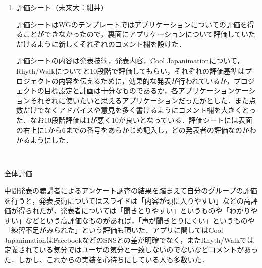 \begin{enumerate}
\item 評価シート（未来大：紺井）
\par
評価シートはWGのテンプレートではアプリケーションについての評価を得ることができなかったので，裏面にアプリケーションについて評価していただけるように新しくそれぞれのコメント欄を設けた．
\par 評価シートの内容は発表技術，発表内容，Cool Japanimationについて，Rhyth/Walkについてと10段階で評価してもらい，それぞれの評価基準はプロジェクトの内容を伝えるために，効果的な発表が行われているか，プロジェクトの目標設定と計画は十分なものであるか，各アプリケーションケーションそれぞれに使いたいと思えるアプリケーションだったかとした．また点数だけでなくアドバイスや意見を多く書けるようにコメント欄を大きくとった．なお10段階評価は1が悪く10が良いとなっている．評価シートには表面の右上に1から6までの番号をあらかじめ記入し，どの発表者の評価なのかわかるようにした．
\end{enumerate}　
\par
全体評価
\par
中間発表の聴講者によるアンケート調査の結果を踏まえて自分のグループの評価を行うと，発表技術についてはスライドは「内容が頭に入りやすい」などの高評価が得られたが，発表者については「聞きとりやすい」というものや「わかりやすい」などという高評価なものがあれば，「声が聞きとりにくい」というものや「練習不足がみられた」という評価も頂いた．アプリに関してはCool JapanimationはFacebookなどのSNSとの差が明確でなく，またRhyth/Walkでは定義されている気分ではユーザの気分と一致しないのでないなどコメントがあった．しかし、これからの実装を心待ちにしている人も多数いた．
